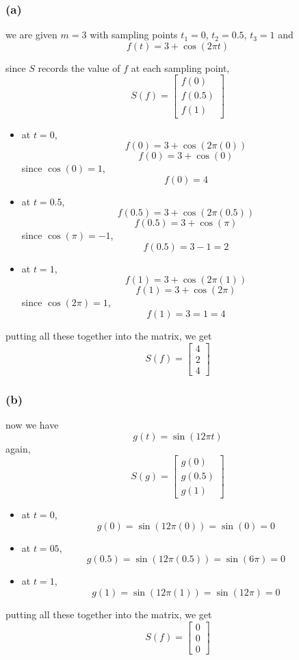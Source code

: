 \documentclass{article}
\begin{document}
\subsubsection*{(a)}
we are given $m=3$ with sampling points $t_1=0$, $t_2=0.5$, $t_3=1$ and 
$$f(t) = 3+\cos(2\pi t)$$

since $S$ records the value of $f$ at each sampling point,
\[
S(f)=
\begin{bmatrix}
    f(0) \\
    f(0.5) \\
    f(1)
\end{bmatrix}
\]
\begin{itemize}
    \item at $t=0$, $$f(0) = 3+\cos(2\pi(0))$$ $$f(0)=3+\cos(0)$$
    since $\cos(0)=1$, $$f(0) = 4$$
    \item at $t=0.5$, $$f(0.5) = 3+\cos(2\pi(0.5))$$ $$f(0.5)=3+\cos(\pi)$$
    since $\cos(\pi)=-1$, $$f(0.5) = 3-1=2$$
    \item at $t=1$, $$f(1) = 3+\cos(2\pi(1))$$ $$f(1)=3+\cos(2\pi)$$
    since $\cos(2\pi)=1$, $$f(1) = 3=1=4$$
\end{itemize}

putting all these together into the matrix, we get
\[
\boxed{
    S(f) = 
    \begin{bmatrix}
        4\\
        2\\
        4
    \end{bmatrix}
}
\]

\subsubsection*{(b)}
now we have $$g(t) = \sin(12\pi t)$$
again,
\[
S(g) = 
\begin{bmatrix}
    g(0)\\
    g(0.5)\\
    g(1)
\end{bmatrix}
\]

\begin{itemize}
    \item at $t=0$, $$g(0)=\sin(12\pi(0))=\sin(0) = 0$$
    \item at $t=05$, $$g(0.5)=\sin(12\pi(0.5))=\sin(6\pi) = 0$$
    \item at $t=1$, $$g(1)=\sin(12\pi(1))=\sin(12\pi) = 0$$
\end{itemize}

putting all these together into the matrix, we get
\[
\boxed{
    S(f) = 
    \begin{bmatrix}
        0\\
        0\\
        0
    \end{bmatrix}
}
\]
\end{document}
